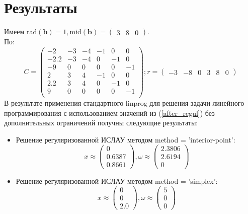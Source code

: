 \documentclass[12pt,a4paper]{scrartcl}
\begin{document}
\section {Результаты}

Имеем rad$(\textbf{b}) = 1, $mid$(\textbf{b}) = \begin{pmatrix}3 & 8 & 0\end{pmatrix}$.\\
По:
\begin{equation}
    C = \begin{pmatrix}
    -2 & -3 & -4 & -1 & 0 & 0 \\
    -2.2 & -3 & -4 & 0 & -1 & 0 \\
    -9 & 0 & 0 & 0 & 0 & -1 \\
    2 & 3 & 4 & -1 & 0 & 0 \\
    2.2 & 3 & 4 & 0 & -1 & 0 \\
    9 & 0 & 0 & 0 & 0 & -1 \\
    \end{pmatrix};
    r = \begin{pmatrix}-3 & -8 & 0 & 3 & 8 & 0\end{pmatrix}
    \label{after_regul}
\end{equation}
В результате применения стандартного linprog для решения задачи линейного программирования с использованием значений из (\ref{after_regul}) без дополнительных ограничений получны следующие результаты:
\begin{itemize}
    \item Решение регуляризованной ИСЛАУ методом method = ’interior-point’:
    \begin{equation}
        x \approx \begin{pmatrix}
        0 \\ 0.6387 \\ 0.8661
        \end{pmatrix},
        \omega \approx \begin{pmatrix}
        2.3806 \\2.6194 \\ 0
        \end{pmatrix}
        \label{res_ip}
    \end{equation}
     \item Решение регуляризованной ИСЛАУ методом method = ’simplex’:
    \begin{equation}
        x \approx \begin{pmatrix}
        0 \\ 0 \\ 2.0
        \end{pmatrix},
        \omega \approx \begin{pmatrix}
        5 \\ 0 \\ 0 
        \end{pmatrix}
        \label{res_simpl}
    \end{equation}
\end{itemize}
\end{document}
